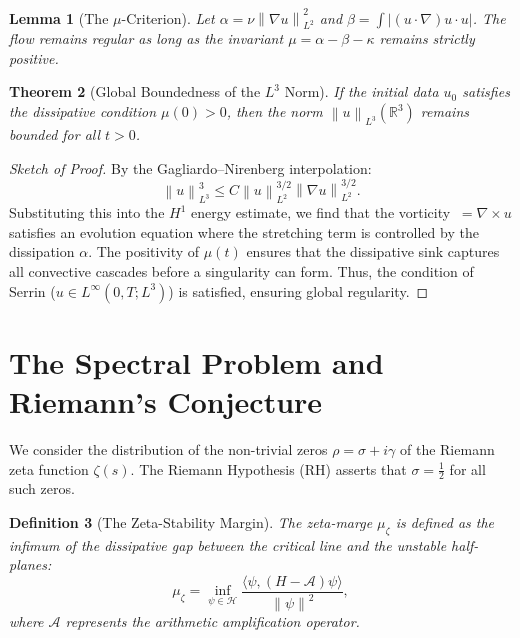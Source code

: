 \documentclass[11pt,a4paper]{amsart}
\newtheorem{theorem}{Theorem}[section]
\newtheorem{lemma}[theorem]{Lemma}
\newtheorem{definition}[theorem]{Definition}
\newcommand{\alphacoeff}{\ensuremath{\alpha}}
\newcommand{\betacoeff}{\ensuremath{\beta}}
\newcommand{\kappacoeff}{\ensuremath{\kappa}}
\newcommand{\mumargin}{\ensuremath{\mu}}
\newcommand{\norm}[1]{\left\|#1\right\|}
\begin{document}
\begin{lemma}[The $\mumargin$-Criterion]
Let $\alphacoeff = \nu \norm{\nabla u}_{L^2}^2$ and $\betacoeff = \int |(u \cdot \nabla)u \cdot u|$.
The flow remains regular as long as the invariant $\mumargin = \alphacoeff - \betacoeff - \kappacoeff$
remains strictly positive.
\end{lemma}

\begin{theorem}[Global Boundedness of the $L^3$ Norm]
If the initial data $u_0$ satisfies the dissipative condition $\mumargin(0) > 0$,
then the norm $\norm{u}_{L^3}(\mathbb{R}^3)$ remains bounded for all $t > 0$.
\end{theorem}

\begin{proof}[Sketch of Proof]
By the Gagliardo--Nirenberg interpolation:
\begin{equation}
 \norm{u}_{L^3}^3 \le C \norm{u}_{L^2}^{3/2} \norm{\nabla u}_{L^2}^{3/2}.
\end{equation}
Substituting this into the $H^1$ energy estimate, we find that the
vorticity $\ = \nabla \times u$ satisfies an evolution equation
where the stretching term is controlled by the dissipation
$\alphacoeff$. The positivity of $\mumargin(t)$ ensures that the
dissipative sink captures all convective cascades before a singularity
can form. Thus, the condition of Serrin ($u \in L^{\infty}(0, T; L^3)$)
is satisfied, ensuring global regularity.
\end{proof}

\section{The Spectral Problem and Riemann's Conjecture}
We consider the distribution of the non-trivial zeros $\rho = \sigma + i\gamma$
of the Riemann zeta function $\zeta(s)$. The Riemann Hypothesis
(RH) asserts that $\sigma = \tfrac{1}{2}$ for all such zeros.

\begin{definition}[The Zeta-Stability Margin]
The zeta-marge $\mumargin_{\zeta}$ is defined as the infimum of the
dissipative gap between the critical line and the unstable half-planes:
\begin{equation}
 \mumargin_{\zeta} = \inf_{\psi \in \mathcal{H}} \frac{\langle \psi, (H - \mathscr{A})\psi \rangle}{\norm{\psi}^2},
\end{equation}
where $\mathscr{A}$ represents the arithmetic amplification operator.
\end{definition}
\end{document}
